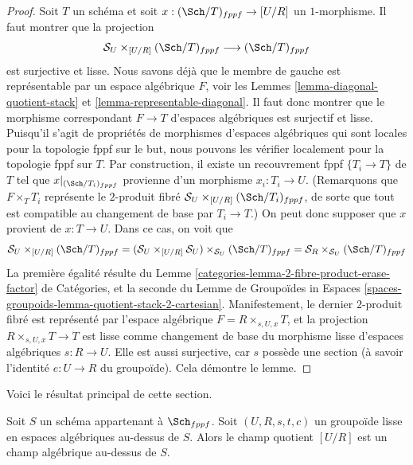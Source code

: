 \begin{proof}
Soit $T$ un schéma et soit $x : (\Sch/T)_{fppf} \to [U/R]$
un $1$-morphisme. Il faut montrer que la projection
$$
\mathcal{S}_U \times_{[U/R]} (\Sch/T)_{fppf}
\longrightarrow
(\Sch/T)_{fppf}
$$
est surjective et lisse. Nous savons déjà que le membre de gauche
est représentable par un espace algébrique $F$, voir les
Lemmes \ref{lemma-diagonal-quotient-stack} et
\ref{lemma-representable-diagonal}.
Il faut donc montrer que le morphisme correspondant $F \to T$
d'espaces algébriques est surjectif et lisse.
Puisqu'il s'agit de propriétés de morphismes d'espaces algébriques
qui sont locales pour la topologie fppf sur le but, nous
pouvons les vérifier localement pour la topologie fppf sur $T$. Par construction, il existe
un recouvrement fppf $\{T_i \to T\}$ de $T$ tel que
$x|_{(\Sch/T_i)_{fppf}}$ provienne d'un morphisme
$x_i : T_i \to U$. (Remarquons que $F \times_T T_i$ représente le
$2$-produit fibré $\mathcal{S}_U \times_{[U/R]} (\Sch/T_i)_{fppf}$,
de sorte que tout est compatible au changement de base par $T_i \to T$.)
On peut donc supposer que $x$ provient de $x : T \to U$.
Dans ce cas, on voit que
$$
\mathcal{S}_U \times_{[U/R]} (\Sch/T)_{fppf}
=
(\mathcal{S}_U \times_{[U/R]} \mathcal{S}_U)
\times_{\mathcal{S}_U} (\Sch/T)_{fppf}
=
\mathcal{S}_R \times_{\mathcal{S}_U} (\Sch/T)_{fppf}
$$
La première égalité résulte du
Lemme \ref{categories-lemma-2-fibre-product-erase-factor} de Catégories,
et la seconde du
Lemme de Groupoïdes in Espaces
\ref{spaces-groupoids-lemma-quotient-stack-2-cartesian}.
Manifestement, le dernier $2$-produit fibré est représenté par l'espace
algébrique $F = R \times_{s, U, x} T$, et la projection
$R \times_{s, U, x} T \to T$ est lisse comme changement de base du
morphisme lisse d'espaces algébriques $s : R \to U$.
Elle est aussi surjective, car $s$ possède une section (à savoir l'identité
$e : U \to R$ du groupoïde).
Cela démontre le lemme.
\end{proof}

\noindent
Voici le résultat principal de cette section.

\begin{theorem}
\label{theorem-smooth-groupoid-gives-algebraic-stack}
Soit $S$ un schéma appartenant à $\Sch_{fppf}$.
Soit $(U, R, s, t, c)$ un groupoïde lisse en espaces algébriques au-dessus de $S$.
Alors le champ quotient $[U/R]$ est un champ algébrique au-dessus de $S$.
\end{theorem}


